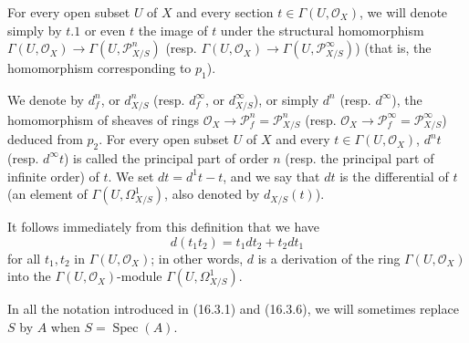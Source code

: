 For every open subset $U$ of $X$ and every section $t\in\Gamma(U,\mathcal{O}_X)$, we
will denote simply by $t.1$ or even $t$ the image of $t$ under the structural
homomorphism $\Gamma(U,\mathcal{O}_X)\to\Gamma(U,\mathscr{P}_{X/S}^n)$ (resp.
$\Gamma(U,\mathcal{O}_X)\to\Gamma(U,\mathscr{P}_{X/S}^\infty)$)
(that is, the homomorphism corresponding to $p_1$).

\begin{definition}[16.3.6]\label{IV.16.3.6}
We denote by $d_f^n$, or $d_{X/S}^n$ (resp. $d_f^\infty$, or
$d_{X/S}^\infty$), or simply $d^n$ (resp. $d^\infty$), the homomorphism of
sheaves of rings $\mathcal{O}_X\to\mathscr{P}_f^n=\mathscr{P}_{X/S}^n$
(resp. $\mathcal{O}_X\to\mathscr{P}_f^\infty=\mathscr{P}_{X/S}^\infty$)
deduced from $p_2$. For every open subset $U$ of $X$ and every
$t\in\Gamma(U,\mathcal{O}_X)$, $d^nt$ (resp. $d^\infty t$) is called the principal
part of order $n$ (resp. the principal part of infinite order) of $t$. We set
$dt=d^1t-t$, and we say that $dt$ is the differential of $t$ (an element of
$\Gamma(U,\Omega_{X/S}^1)$, also denoted by $d_{X/S}(t)$).
\end{definition}

It follows immediately from this definition that we have
\[
  d(t_1t_2)=t_1dt_2+t_2dt_1
  \tag{16.3.6.1}
  \label{IV.16.3.6.1}
\]
for all $t_1,t_2$ in $\Gamma(U,\mathcal{O}_X)$; in other words, $d$
is a derivation of the ring $\Gamma(U,\mathcal{O}_X)$ into the
$\Gamma(U,\mathcal{O}_X)$-module $\Gamma(U,\Omega_{X/S}^1)$.

In all the notation introduced in (16.3.1) and (16.3.6), we will
sometimes replace $S$ by $A$ when $S=\operatorname{Spec}(A)$.

